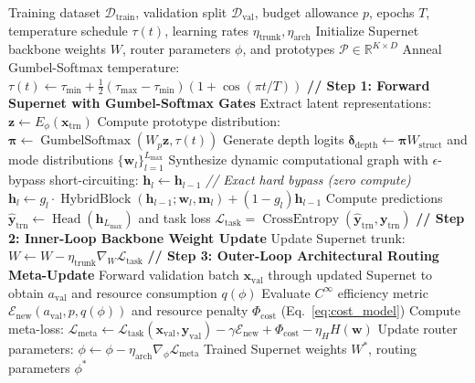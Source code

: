 \documentclass[11pt, a4paper]{article}
\begin{document}
\begin{algorithm}[t]
\caption{Unified Architecture Mode Learning (AML) Meta-Training}
\label{alg:aml}
\begin{algorithmic}[1]
\REQUIRE Training dataset $\mathcal{D}_{\text{train}}$, validation split $\mathcal{D}_{\text{val}}$, budget allowance $p$, epochs $T$, temperature schedule $\tau(t)$, learning rates $\eta_{\text{trunk}}, \eta_{\text{arch}}$
\STATE Initialize Supernet backbone weights $W$, router parameters $\phi$, and prototypes $\mathcal{P} \in \mathbb{R}^{K \times D}$
    \STATE Anneal Gumbel-Softmax temperature: $\tau(t) \gets \tau_{\min} + \frac{1}{2}(\tau_{\max} - \tau_{\min})(1 + \cos(\pi t / T))$
        \STATE \textbf{// Step 1: Forward Supernet with Gumbel-Softmax Gates}
        \STATE Extract latent representations: $\mathbf{z} \gets E_\phi(\mathbf{x}_{\text{trn}})$
        \STATE Compute prototype distribution: $\boldsymbol{\pi} \gets \operatorname{GumbelSoftmax}(W_p \mathbf{z}, \tau(t))$
        \STATE Generate depth logits $\boldsymbol{\delta}_{\text{depth}} \gets \boldsymbol{\pi} W_{\text{struct}}$ and mode distributions $\{\mathbf{w}_l\}_{l=1}^{L_{\max}}$
        \STATE Synthesize dynamic computational graph with $\epsilon$-bypass short-circuiting:
                \STATE $\mathbf{h}_l \gets \mathbf{h}_{l-1}$ \hfill \textit{// Exact hard bypass (zero compute)}
            \ELSE
                \STATE $\mathbf{h}_l \gets g_l \cdot \operatorname{HybridBlock}(\mathbf{h}_{l-1}; \mathbf{w}_l, \mathbf{m}_l) + (1 - g_l) \mathbf{h}_{l-1}$
            \ENDIF
        \ENDFOR
        \STATE Compute predictions $\hat{\mathbf{y}}_{\text{trn}} \gets \operatorname{Head}(\mathbf{h}_{L_{\max}})$ and task loss $\mathcal{L}_{\text{task}} = \operatorname{CrossEntropy}(\hat{\mathbf{y}}_{\text{trn}}, \mathbf{y}_{\text{trn}})$
        \STATE \textbf{// Step 2: Inner-Loop Backbone Weight Update}
        \STATE Update Supernet trunk: $W \gets W - \eta_{\text{trunk}} \nabla_W \mathcal{L}_{\text{task}}$
        \STATE \textbf{// Step 3: Outer-Loop Architectural Routing Meta-Update}
        \STATE Forward validation batch $\mathbf{x}_{\text{val}}$ through updated Supernet to obtain $a_{\text{val}}$ and resource consumption $q(\phi)$
        \STATE Evaluate $C^\infty$ efficiency metric $\mathcal{E}_{\text{new}}(a_{\text{val}}, p, q(\phi))$ and resource penalty $\Phi_{\text{cost}}$ (Eq.~\ref{eq:cost_model})
        \STATE Compute meta-loss: $\mathcal{L}_{\text{meta}} \gets \mathcal{L}_{\text{task}}(\mathbf{x}_{\text{val}}, \mathbf{y}_{\text{val}}) - \gamma \mathcal{E}_{\text{new}} + \Phi_{\text{cost}} - \eta_H H(\mathbf{w})$
        \STATE Update router parameters: $\phi \gets \phi - \eta_{\text{arch}} \nabla_\phi \mathcal{L}_{\text{meta}}$
    \ENDFOR
\ENDFOR
\RETURN Trained Supernet weights $W^*$, routing parameters $\phi^*$
\end{algorithmic}
\end{algorithm}
\end{document}
